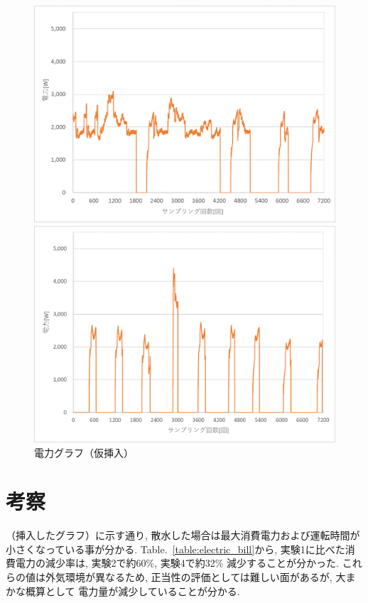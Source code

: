 \documentclass[a4j,fleqn,dvipdfmx,uplatex]{jsarticle}
\newcommand{\tableref}[1]{Table.\ \ref{#1}}
\begin{document}
\begin{figure}[htb]
\begin{minipage}[b]{0.46\linewidth}
      \includegraphics[width=\linewidth]{img/0719_power.png}
    \end{minipage}
    \begin{minipage}[b]{0.46\linewidth}
      \centering
      \includegraphics[width=\linewidth]{img/0721_power.png}
    \end{minipage}
  \caption{電力グラフ（仮挿入）}
  \label{fig2:ex_outputs}
\end{figure}

\section{考察}
（挿入したグラフ）に示す通り, 散水した場合は最大消費電力および運転時間が
小さくなっている事が分かる. 
\tableref{table:electric_bill}から, 実験1に比べた消費電力の減少率は, 実験2で約60\%, 
実験4で約32\% 減少することが分かった. 
これらの値は外気環境が異なるため, 正当性の評価としては難しい面があるが, 大まかな概算として
電力量が減少していることが分かる. 
\end{document}
